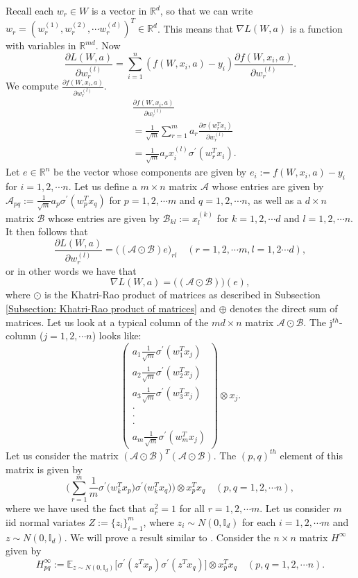\documentclass[a4paper,11pt]{amsart}
\newcommand{\IE}{\mathbb{E}}
\theoremstyle{definition}
\theoremstyle{plain}
\theoremstyle{remark}
\newcommand{\IR}{\mathbb{R}}
\newcommand{\cla}{\mathcal{A}}
\newcommand{\ot}{\otimes}
\begin{document}
Recall each $w_r\in W$ is a vector in $\IR^d$, so that we can write $w_r=(w_r^{(1)},w_r^{(2)},\cdots w_r^{(d)})^T\in\IR^d$. This means that $\nabla L(W,a)$ is a function with variables in $\IR^{md}$. Now 
\[
\frac{\partial L(W,a)}{\partial w_r^{(l)}}=\sum_{i=1}^n(f(W,x_i,a)-y_i)\frac{\partial f(W,x_i,a)}{\partial w_r^{(l)}}. 
\]
We compute $\frac{\partial f(W,x_i,a)}{\partial w_r^{(l)}}$.
\begin{equation}
\begin{split}
&\frac{\partial f(W,x_i,a)}{\partial w_r^{(l)}}\\
&=\frac{1}{\sqrt{m}}\sum_{r=1}^ma_r\frac{\partial \sigma(w_r^Tx_i)}{\partial w_r^{(l)}}\\
&=\frac{1}{\sqrt{m}} a_r x_i^{(l)}\sigma^\prime(w_r^Tx_i).
\end{split}
\end{equation}
Let $e\in\IR^n$ be the vector whose components are given by $e_i:=f(W,x_i,a)-y_i$ for $i=1,2,\cdots n$. Let us define a $m\times n$ matrix $\cla$ whose entries are given by $\cla_{pq}:=\frac{1}{\sqrt{m}}a_p\sigma^\prime(w_p^Tx_q)$ for $p=1,2,\cdots m$ and $q=1,2,\cdots n$, as well as a $d\times n$ matrix $\mathcal{B}$ whose entries are given by $\mathcal{B}_{kl}:=x_l^{(k)}$ for $k=1,2,\cdots d$ and $l=1,2,\cdots n$. It then follows that 
\[
\frac{\partial L(W,a)}{\partial w_r^{(l)}}=\Big((\cla\odot\mathcal{B})e\Big)_{rl}\quad(r=1,2,\cdots m, l=1,2\cdots d), 
\]
or in other words we have that 
\[
\nabla L(W,a) = \Big((\cla\odot\mathcal{B})\Big)(e),
\]
where $\odot$ is the Khatri-Rao product of matrices as described in Subsection \ref{Subsection: Khatri-Rao product of matrices} and $\oplus$ denotes the direct sum of matrices. Let us look at a typical column of the $md\times n$ matrix $\cla\odot\mathcal{B}$. The j$^{th}$-column ($j=1,2,\cdots n$) looks like:
\[
\begin{pmatrix}
a_1\frac{1}{\sqrt{m}}\sigma^\prime(w_1^Tx_j)\\
a_2\frac{1}{\sqrt{m}}\sigma^\prime(w_2^Tx_j)\\
a_3\frac{1}{\sqrt{m}}\sigma^\prime(w_3^Tx_j)\\
\cdot\\
\cdot\\
\cdot\\
a_m\frac{1}{\sqrt{m}}\sigma^\prime(w_m^Tx_j)
\end{pmatrix}\otimes x_j.
\]
Let us consider the  matrix $(\cla\odot\mathcal{B})^T(\cla\odot\mathcal{B})$. The $(p,q)^{th}$ element of this matrix is given by 
\[
\Big(\sum_{r=1}^m \frac{1}{m}\sigma^\prime\Big(w_k^Tx_p\Big)\sigma^\prime\Big(w_k^Tx_q\Big)\Big)\ot x_p^Tx_q\quad(p,q=1,2,\cdots n),
\]
where we have used the fact that $a_r^2=1$ for all $r=1,2,\cdots m$.
Let us consider $m$ iid normal variates $Z:=\{z_i\}_{i=1}^m$, where $z_i\sim N(0,\mathbb{I}_d)$ for each $i=1,2,\cdots m$ and $z\sim N(0,\mathbb{I}_d)$. We will prove a result similar to \cite[Theorem 3.1]{gdescentOverPara1}. Consider the $n\times n$ matrix $H^\infty$ given by 
\[
H^\infty_{pq}:=\IE_{z\sim N(0,\mathbb{I}_d)}\Big[\sigma^\prime(z^Tx_p)\sigma^\prime(z^Tx_q)\Big]\ot x_p^Tx_q\quad(p,q=1,2,\cdots n).
\]
\end{document}
